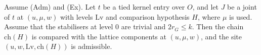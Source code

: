 \begin{theorem}\label{pf:reckernel:jointSite}
Assume \textup{(Adm)} and \textup{(Ex)}. Let $t$ be a tied kernel entry over $O$, and let $J$ be a joint of $t$ at
$(u,\mu,w)$ with levels $\mathrm{Lv}$ and comparison hypothesis $H$, where $\mu$ is used. Assume that the stabilisers at
level $0$ are trivial and $2r_G\le k$. Then the chain $\mathrm{ch}(H)$ is compared with the lattice components at
$(u,\mu,w)$, and the site $(u,w,\mathrm{Lv},\mathrm{ch}(H))$ is admissible.
\end{theorem}

